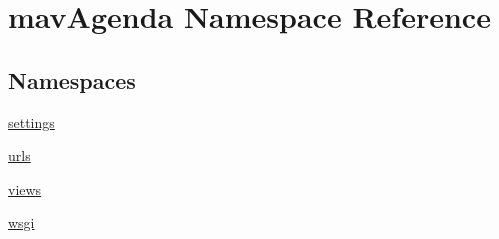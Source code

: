 \hypertarget{namespacemavAgenda}{}\section{mav\+Agenda Namespace Reference}
\label{namespacemavAgenda}
\subsection*{Namespaces}
\begin{DoxyCompactItemize}
\item 
 \mbox{\hyperlink{namespacemavAgenda_1_1settings}{settings}}
\item 
 \mbox{\hyperlink{namespacemavAgenda_1_1urls}{urls}}
\item 
 \mbox{\hyperlink{namespacemavAgenda_1_1views}{views}}
\item 
 \mbox{\hyperlink{namespacemavAgenda_1_1wsgi}{wsgi}}
\end{DoxyCompactItemize}
